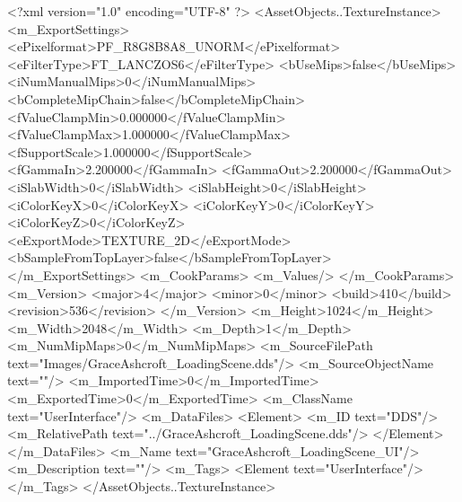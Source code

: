 <?xml version="1.0" encoding="UTF-8" ?>
<AssetObjects..TextureInstance>
	<m_ExportSettings>
		<ePixelformat>PF_R8G8B8A8_UNORM</ePixelformat>
		<eFilterType>FT_LANCZOS6</eFilterType>
		<bUseMips>false</bUseMips>
		<iNumManualMips>0</iNumManualMips>
		<bCompleteMipChain>false</bCompleteMipChain>
		<fValueClampMin>0.000000</fValueClampMin>
		<fValueClampMax>1.000000</fValueClampMax>
		<fSupportScale>1.000000</fSupportScale>
		<fGammaIn>2.200000</fGammaIn>
		<fGammaOut>2.200000</fGammaOut>
		<iSlabWidth>0</iSlabWidth>
		<iSlabHeight>0</iSlabHeight>
		<iColorKeyX>0</iColorKeyX>
		<iColorKeyY>0</iColorKeyY>
		<iColorKeyZ>0</iColorKeyZ>
		<eExportMode>TEXTURE_2D</eExportMode>
		<bSampleFromTopLayer>false</bSampleFromTopLayer>
	</m_ExportSettings>
	<m_CookParams>
		<m_Values/>
	</m_CookParams>
	<m_Version>
		<major>4</major>
		<minor>0</minor>
		<build>410</build>
		<revision>536</revision>
	</m_Version>
	<m_Height>1024</m_Height>
	<m_Width>2048</m_Width>
	<m_Depth>1</m_Depth>
	<m_NumMipMaps>0</m_NumMipMaps>
	<m_SourceFilePath text="Images/GraceAshcroft_LoadingScene.dds"/>
	<m_SourceObjectName text=""/>
	<m_ImportedTime>0</m_ImportedTime>
	<m_ExportedTime>0</m_ExportedTime>
	<m_ClassName text="UserInterface"/>
	<m_DataFiles>
		<Element>
			<m_ID text="DDS"/>
			<m_RelativePath text="../GraceAshcroft_LoadingScene.dds"/>
		</Element>
	</m_DataFiles>
	<m_Name text="GraceAshcroft_LoadingScene_UI"/>
	<m_Description text=""/>
	<m_Tags>
		<Element text="UserInterface"/>
	</m_Tags>
</AssetObjects..TextureInstance>
